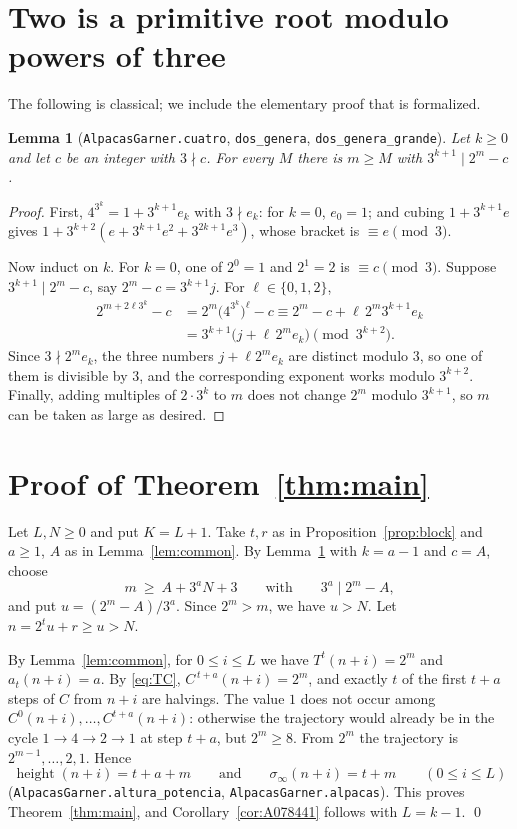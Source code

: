 \documentclass[11pt]{amsart}
\newtheorem{lemma}[theorem]{Lemma}
\theoremstyle{definition}
\theoremstyle{remark}
\newcommand{\lean}[1]{\nolinkurl{#1}}
\begin{document}
\section{Two is a primitive root modulo powers of three}\label{sec:primitive}

The following is classical; we include the elementary proof that is formalized.

\begin{lemma}[\lean{AlpacasGarner.cuatro}, \lean{dos_genera}, \lean{dos_genera_grande}]\label{lem:primitive}
Let $k\ge0$ and let $c$ be an integer with $3\nmid c$. For every $M$ there is $m\ge M$ with $3^{k+1}\mid 2^m-c$.
\end{lemma}

\begin{proof}
First, $4^{3^k}=1+3^{k+1}e_k$ with $3\nmid e_k$: for $k=0$, $e_0=1$; and cubing $1+3^{k+1}e$ gives $1+3^{k+2}(e+3^{k+1}e^2+3^{2k+1}e^3)$, whose bracket is $\equiv e\pmod 3$.

Now induct on $k$. For $k=0$, one of $2^0=1$ and $2^1=2$ is $\equiv c\pmod 3$. Suppose $3^{k+1}\mid 2^m-c$, say $2^m-c=3^{k+1}j$. For $\ell\in\{0,1,2\}$,
\begin{align*}
2^{m+2\ell 3^k}-c&=2^m\bigl(4^{3^k}\bigr)^{\ell}-c\equiv 2^m-c+\ell\,2^m 3^{k+1}e_k\\
&=3^{k+1}\bigl(j+\ell\,2^me_k\bigr)\pmod{3^{k+2}}.
\end{align*}
Since $3\nmid 2^me_k$, the three numbers $j+\ell 2^me_k$ are distinct modulo $3$, so one of them is divisible by $3$, and the corresponding exponent works modulo $3^{k+2}$. Finally, adding multiples of $2\cdot3^k$ to $m$ does not change $2^m$ modulo $3^{k+1}$, so $m$ can be taken as large as desired.
\end{proof}

\section{Proof of Theorem~\ref{thm:main}}\label{sec:proof}

Let $L,N\ge0$ and put $K=L+1$. Take $t,r$ as in Proposition~\ref{prop:block} and $a\ge1$, $A$ as in Lemma~\ref{lem:common}. By Lemma~\ref{lem:primitive} with $k=a-1$ and $c=A$, choose
\[
m\ \ge\ A+3^aN+3\qquad\text{with}\qquad 3^a\mid 2^m-A,
\]
and put $u=(2^m-A)/3^a$. Since $2^m>m$, we have $u>N$. Let $n=2^tu+r\ge u>N$.

By Lemma~\ref{lem:common}, for $0\le i\le L$ we have $T^{t}(n+i)=2^m$ and $a_t(n+i)=a$. By \eqref{eq:TC}, $C^{\,t+a}(n+i)=2^m$, and exactly $t$ of the first $t+a$ steps of $C$ from $n+i$ are halvings. The value $1$ does not occur among $C^{0}(n+i),\dots,C^{t+a}(n+i)$: otherwise the trajectory would already be in the cycle $1\to4\to2\to1$ at step $t+a$, but $2^m\ge 8$. From $2^m$ the trajectory is $2^{m-1},\dots,2,1$. Hence
\[
\operatorname{height}(n+i)=t+a+m\qquad\text{and}\qquad \sigma_\infty(n+i)=t+m\qquad(0\le i\le L)
\]
(\lean{AlpacasGarner.altura_potencia}, \lean{AlpacasGarner.alpacas}). This proves Theorem~\ref{thm:main}, and Corollary~\ref{cor:A078441} follows with $L=k-1$. \qed
\end{document}
